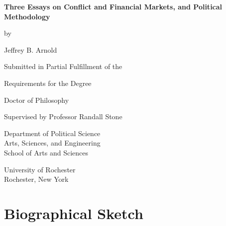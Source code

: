 \documentclass[12pt,oneside]{book}\usepackage[]{graphicx}\usepackage[]{color}
\newcommand{\myauthor}{Jeffrey B. Arnold}
\newcommand{\myinstitution}{University of Rochester}
\newcommand{\mylocation}{Rochester, New York}
\newcommand{\mytitle}{Three Essays on Conflict and Financial Markets, and Political Methodology}
\newcommand{\myadvisor}{Randall Stone}
\newcommand{\myyear}{2016}
\begin{document}
\begin{titlepage}
  \vspace*{\fill}

  \begin{center}
    {\LARGE \bfseries \mytitle \par}

    \bigskip%
    by

    \bigskip%
    \myauthor


    \bigskip\bigskip\bigskip\bigskip%
    Submitted in Partial Fulfillment of the

    \bigskip%
    Requirements for the Degree

    \bigskip%
    Doctor of Philosophy


    \bigskip\bigskip\bigskip\bigskip%
    Supervised by Professor \myadvisor{}

    \bigskip\bigskip%
    Department of Political Science \\
    Arts, Sciences, and Engineering \\
    School of Arts and Sciences


    \bigskip\bigskip\bigskip\bigskip%
    \myinstitution{} \\
    \mylocation{}


    \bigskip\bigskip\bigskip\bigskip%
    \myyear{}
  \end{center}

  \vspace*{\fill}
\end{titlepage}



\pagestyle{plain}
\setcounter{page}{2}
\doublespacing

%   

\clearpage


\chapter*{Biographical Sketch}

\end{document}
